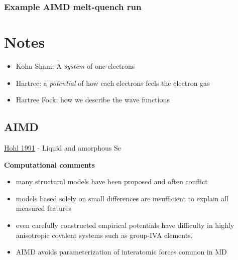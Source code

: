 \documentclass[3p,review,12pt]{elsarticle}
\newcommand{\vs}{\vspace{2mm}}
\begin{document}
\subsubsection{Example AIMD melt-quench run}


\pagebreak

\section*{Notes}

\begin{itemize}
	\item Kohn Sham: A \emph{system} of one-electrons
	\item Hartree: a \emph{potential} of how each electrons feels the electron gas
	\item Hartree Fock: how we describe the wave functions
\end{itemize}
\subsection{AIMD}
\underline{Hohl 1991}\cite{Hohl1991} - Liquid and amorphous Se \par \vs
\textbf{Computational comments}
\begin{itemize}
	\item many structural models have been proposed and often conflict
	\item models based solely on small differences are insufficient to explain all measured features
	\item even carefully constructed empirical potentials have difficulty in highly anisotropic covalent systems such as group-IVA elements.
	\item AIMD avoids parameterization of interatomic forces common in MD
\end{itemize}
\end{document}
